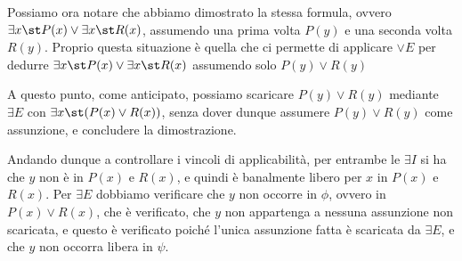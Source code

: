 Possiamo ora notare che abbiamo dimostrato la stessa formula, ovvero \(\exists x\st P(x) \lor \exists x\st R(x)\), assumendo una prima volta \(P(y)\) e una seconda volta \(R(y)\). Proprio questa situazione è quella che ci permette di applicare \(\lor E\) per dedurre \(\exists x\st P(x) \lor \exists x\st R(x)\) assumendo solo \(P(y) \lor R(y)\)


\begin{prooftree}



\end{prooftree}

A questo punto, come anticipato, possiamo scaricare \(P(y) \lor R(y)\) mediante \(\exists E\) con \(\exists x\st (P(x)\lor R(x))\), senza dover dunque assumere \(P(y)\lor R(y)\) come assunzione, e concludere la dimostrazione.

\begin{prooftree}
  \small




  
\end{prooftree}

Andando dunque a controllare i vincoli di applicabilità, per entrambe le \(\exists I\) si ha che \(y\) non è in \(P(x)\) e \(R(x)\), e quindi è banalmente libero per \(x\) in \(P(x)\) e \(R(x)\).
Per \(\exists E\) dobbiamo verificare che \(y\) non occorre in \(\phi\), ovvero in \(P(x)\lor R(x)\), che è verificato, che \(y\) non appartenga a nessuna assunzione non scaricata, e questo è verificato poiché l'unica assunzione fatta è scaricata da \(\exists E\), e che \(y\) non occorra libera in \(\psi\).

